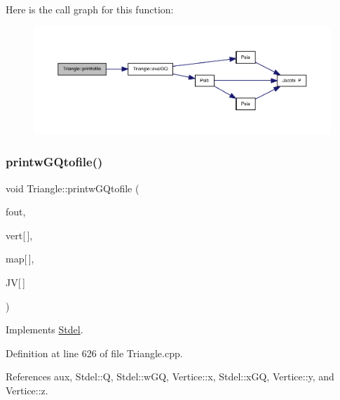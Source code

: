 Here is the call graph for this function\+:
\nopagebreak
\begin{figure}[H]
\begin{center}
\leavevmode
\includegraphics[width=350pt]{classTriangle_ab95679ba1b3e20ac9e585ffe409f7972_cgraph}
\end{center}
\end{figure}
\mbox{\label{classTriangle_aaedabb652f02c2324f9503816b538d9a}} 
\subsubsection{\texorpdfstring{printw\+G\+Qtofile()}{printwGQtofile()}}
{\footnotesize\ttfamily void Triangle\+::printw\+G\+Qtofile (\begin{DoxyParamCaption}\item[{F\+I\+LE $\ast$}]{fout,  }\item[{const \hyperlink{structVertice}{Vertice}}]{vert\mbox{[}$\,$\mbox{]},  }\item[{const int}]{map\mbox{[}$\,$\mbox{]},  }\item[{const double}]{JV\mbox{[}$\,$\mbox{]} }\end{DoxyParamCaption})\hspace{0.3cm}{\ttfamily [virtual]}}



Implements \hyperlink{classStdel_aec7751f7873772d930c91cf93ec6b07b}{Stdel}.



Definition at line 626 of file Triangle.\+cpp.



References aux, Stdel\+::Q, Stdel\+::w\+GQ, Vertice\+::x, Stdel\+::x\+GQ, Vertice\+::y, and Vertice\+::z.

\mbox{\label{classStdel_aeea4659f5bcabbf1acb374180c43a293}} 
